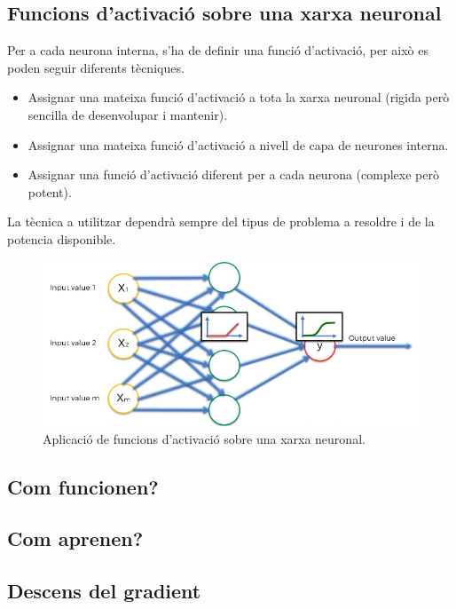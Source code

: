 \documentclass[12pt]{article}
\begin{document}
\subsection{Funcions d'activació sobre una xarxa neuronal}
Per a cada neurona interna, s'ha de definir una funció d'activació, per això es poden seguir diferents tècniques.
\begin{itemize}
	\item Assignar una mateixa funció d'activació a tota la xarxa neuronal (rigida però sencilla de desenvolupar i mantenir).
	\item Assignar una mateixa funció d'activació a nivell de capa de neurones interna.
	\item Assignar una funció d'activació diferent per a cada neurona (complexe però potent).
\end{itemize}
La tècnica a utilitzar dependrà sempre del tipus de problema a resoldre i de la potencia disponible.
\begin{figure}[h!]
	\centering
	\includegraphics[scale=0.3]{imatges/fa/5complet.png}
	\caption{Aplicació de funcions d'activació sobre una xarxa neuronal.}
\end{figure}



\clearpage
\subsection{Com funcionen?}


\clearpage
\subsection{Com aprenen?}


\clearpage
\subsection{Descens del gradient\label{dg}}
\end{document}
